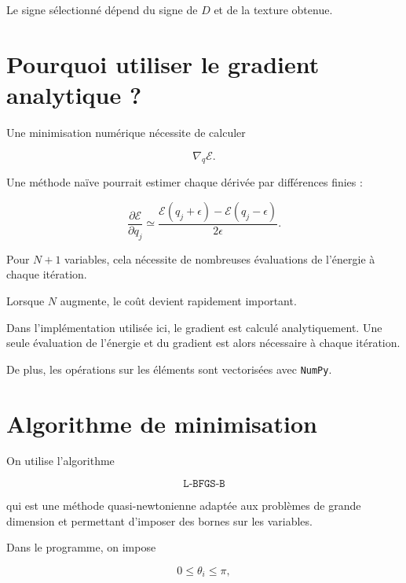 \documentclass[a4paper,11pt]{article}
\begin{document}
Le signe sélectionné dépend du signe de $D$ et de la texture obtenue.

\section{Pourquoi utiliser le gradient analytique ?}

Une minimisation numérique nécessite de calculer

\begin{equation}
\nabla_q\mathcal E.
\end{equation}

Une méthode naïve pourrait estimer chaque dérivée par différences finies :

\begin{equation}
\frac{\partial\mathcal E}{\partial q_j}
\simeq
\frac{
\mathcal E(q_j+\epsilon)
-
\mathcal E(q_j-\epsilon)
}
{2\epsilon}.
\end{equation}

Pour $N+1$ variables, cela nécessite de nombreuses évaluations de
l'énergie à chaque itération.

Lorsque $N$ augmente, le coût devient rapidement important.

Dans l'implémentation utilisée ici, le gradient est calculé analytiquement.
Une seule évaluation de l'énergie et du gradient est alors nécessaire à
chaque itération.

De plus, les opérations sur les éléments sont vectorisées avec
\texttt{NumPy}.

\section{Algorithme de minimisation}

On utilise l'algorithme

\begin{equation}
\boxed{
\texttt{L-BFGS-B}
}
\end{equation}

qui est une méthode quasi-newtonienne adaptée aux problèmes de grande
dimension et permettant d'imposer des bornes sur les variables.

Dans le programme, on impose

\begin{equation}
0\leq\theta_i\leq\pi,
\end{equation}
\end{document}
